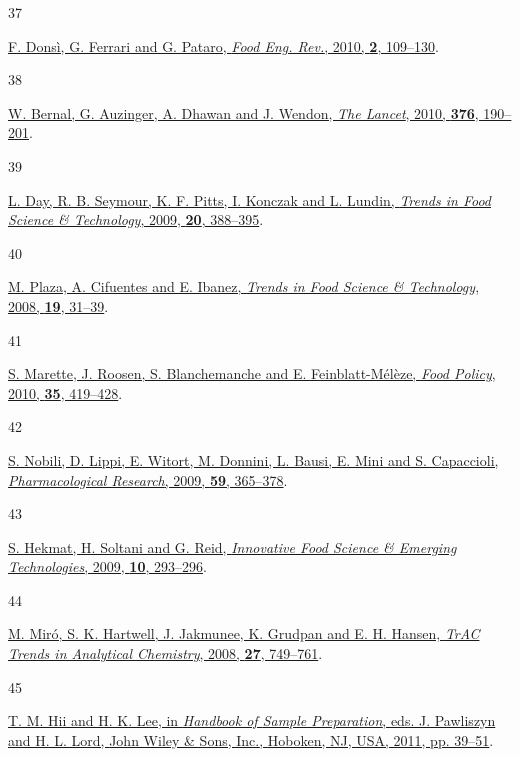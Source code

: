 \documentclass[
  letterpaper,
  DIV=11,
  numbers=noendperiod]{scrartcl}
\newlength{\cslhangindent}
\newlength{\csllabelwidth}
\newenvironment{CSLReferences}[2] %
 {\begin{list}{}{%
  \setlength{\itemindent}{0pt}
  \setlength{\leftmargin}{0pt}
  \setlength{\parsep}{0pt}
  \ifodd #1
   \setlength{\leftmargin}{\cslhangindent}
   \setlength{\itemindent}{-1\cslhangindent}
  \fi
  \setlength{\itemsep}{#2\baselineskip}}}
 {\end{list}}
\newcommand{\CSLLeftMargin}[1]{\parbox[t]{\csllabelwidth}{\strut#1\strut}}
\newcommand{\CSLRightInline}[1]{\parbox[t]{\linewidth - \csllabelwidth}{\strut#1\strut}}
\begin{document}
\begin{CSLReferences}{0}{0}
\CSLLeftMargin{37 }%
\CSLRightInline{\href{https://doi.org/10.1007/s12393-010-9015-3}{F.
Donsì, G. Ferrari and G. Pataro, \emph{Food Eng. Rev.}, 2010,
\textbf{2}, 109--130}.}

\CSLLeftMargin{38 }%
\CSLRightInline{\href{https://doi.org/10.1016/S0140-6736(10)60274-7}{W.
Bernal, G. Auzinger, A. Dhawan and J. Wendon, \emph{The Lancet}, 2010,
\textbf{376}, 190--201}.}

\CSLLeftMargin{39 }%
\CSLRightInline{\href{https://doi.org/10.1016/j.tifs.2008.05.002}{L.
Day, R. B. Seymour, K. F. Pitts, I. Konczak and L. Lundin, \emph{Trends
in Food Science \& Technology}, 2009, \textbf{20}, 388--395}.}

\CSLLeftMargin{40 }%
\CSLRightInline{\href{https://doi.org/10.1016/j.tifs.2007.07.012}{M.
Plaza, A. Cifuentes and E. Ibanez, \emph{Trends in Food Science \&
Technology}, 2008, \textbf{19}, 31--39}.}

\CSLLeftMargin{41 }%
\CSLRightInline{\href{https://doi.org/10.1016/j.foodpol.2010.04.009}{S.
Marette, J. Roosen, S. Blanchemanche and E. Feinblatt-Mélèze, \emph{Food
Policy}, 2010, \textbf{35}, 419--428}.}

\CSLLeftMargin{42 }%
\CSLRightInline{\href{https://doi.org/10.1016/j.phrs.2009.01.017}{S.
Nobili, D. Lippi, E. Witort, M. Donnini, L. Bausi, E. Mini and S.
Capaccioli, \emph{Pharmacological Research}, 2009, \textbf{59},
365--378}.}

\CSLLeftMargin{43 }%
\CSLRightInline{\href{https://doi.org/10.1016/j.ifset.2008.10.007}{S.
Hekmat, H. Soltani and G. Reid, \emph{Innovative Food Science \&
Emerging Technologies}, 2009, \textbf{10}, 293--296}.}

\CSLLeftMargin{44 }%
\CSLRightInline{\href{https://doi.org/10.1016/j.trac.2008.07.003}{M.
Miró, S. K. Hartwell, J. Jakmunee, K. Grudpan and E. H. Hansen,
\emph{TrAC Trends in Analytical Chemistry}, 2008, \textbf{27},
749--761}.}

\CSLLeftMargin{45 }%
\CSLRightInline{\href{https://doi.org/10.1002/9780813823621.ch3}{T. M.
Hii and H. K. Lee, in \emph{Handbook of {Sample Preparation}}, eds. J.
Pawliszyn and H. L. Lord, {John Wiley \& Sons, Inc.}, {Hoboken, NJ,
USA}, 2011, pp. 39--51}.}


\end{CSLReferences}
\end{document}
